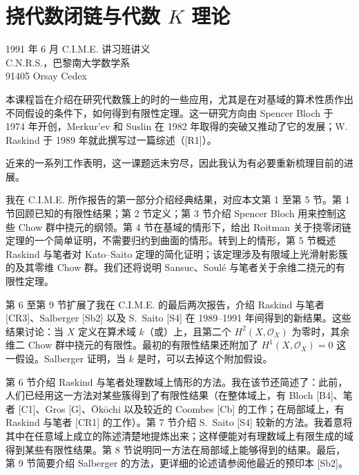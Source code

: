 \chapter{挠代数闭链与代数 \texorpdfstring{$K$}{K} 理论}
\begin{center}
1991 年 6 月 C.I.M.E. 讲习班讲义\\
C.N.R.S.，巴黎南大学数学系\\
91405 Orsay Cedex
\end{center}
本课程旨在介绍在研究代数簇上的时的一些应用，尤其是在对基域的算术性质作出不同假设的条件下，如何得到有限性定理。这一研究方向由 Spencer Bloch 于 1974 年开创，Merkur'ev 和 Suslin 在 1982 年取得的突破又推动了它的发展；W. Raskind 于 1989 年就此撰写过一篇综述（[R1]）。

近来的一系列工作表明，这一课题远未穷尽，因此我认为有必要重新梳理目前的进展。

我在 C.I.M.E. 所作报告的第一部分介绍经典结果，对应本文第 1 至第 5 节。第 1 节回顾已知的有限性结果；第 2 节定义；第 3 节介绍 Spencer Bloch 用来控制这些 Chow 群中挠元的纲领。第 4 节在基域的情形下，给出 Roitman 关于挠零闭链定理的一个简单证明，不需要归约到曲面的情形。转到上的情形，第 5 节概述 Raskind 与笔者对 Kato--Saito 定理的简化证明；该定理涉及有限域上光滑射影簇的及其零维 Chow 群。我们还将说明 Sansuc、Soulé 与笔者关于余维二挠元的有限性定理。

第 6 至第 9 节扩展了我在 C.I.M.E. 的最后两次报告，介绍 Raskind 与笔者 [CR3]、Salberger [Sb2] 以及 S.~Saito [S4] 在 1989--1991 年间得到的新结果。这些结果讨论：当 $X$ 定义在算术域 $k$（或）上，且第二个 $H^2(X,\mathcal O_X)$ 为零时，其余维二 Chow 群中挠元的有限性。最初的有限性结果还附加了 $H^1(X,\mathcal O_X)=0$ 这一假设。Salberger 证明，当 $k$ 是时，可以去掉这个附加假设。

第 6 节介绍 Raskind 与笔者处理数域上情形的方法。我在该节还简述了：此前，人们已经用这一方法对某些簇得到了有限性结果（在整体域上，有 Bloch [B4]、笔者 [C1]、Gros [G]、Ōkōchi 以及较近的 Coombes [Cb] 的工作；在局部域上，有 Raskind 与笔者 [CR1] 的工作）。第 7 节介绍 S.~Saito [S4] 较新的方法。我着意将其中在任意域上成立的陈述清楚地提炼出来；这样便能对有理数域上有限生成的域得到某些有限性结果。第 8 节说明同一方法在局部域上能够得到的结果。最后，第 9 节简要介绍 Salberger 的方法，更详细的论述请参阅他最近的预印本 [Sb2]。

